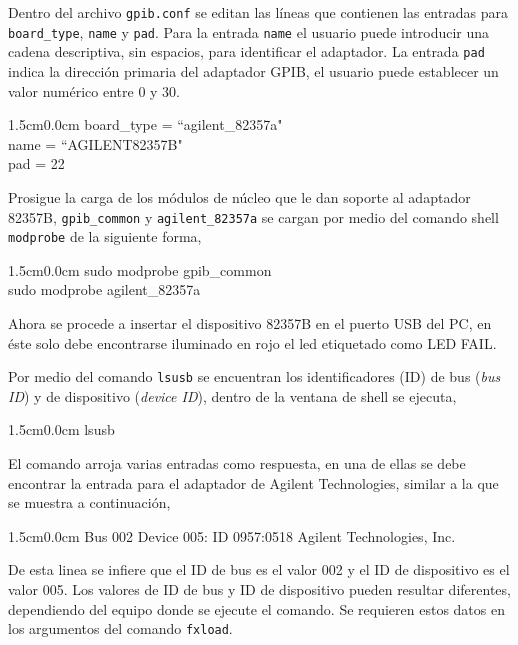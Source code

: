 \documentclass[paper=letter,oneside,fontsize=11pt, parskip=full]{scrartcl}
\newenvironment{code}
	{\begin{adjustwidth}{1.5cm}{0.0cm}\ttfamily}
	{\end{adjustwidth}}
\begin{document}
		Dentro del archivo \texttt{gpib.conf} se editan las líneas que contienen las entradas para \texttt{board\_type}, \texttt{name} y \texttt{pad}. Para la entrada \texttt{name} el usuario puede introducir una cadena descriptiva, sin espacios, para identificar el adaptador. La entrada \texttt{pad} indica la dirección primaria del adaptador GPIB, el usuario puede establecer un valor numérico entre 0 y 30.
		
		\begin{code}	
			board\_type = ``agilent\_82357a" \\		
			name = ``AGILENT82357B" \\		
			pad = 22
		\end{code}
		
		Prosigue la carga de los módulos de núcleo que le dan soporte al adaptador 82357B, \texttt{gpib\_common} y \texttt{agilent\_82357a} se cargan por medio del comando shell \texttt{modprobe} de la siguiente forma,
		
		\begin{code}
			sudo modprobe gpib\_common \\		
			sudo modprobe agilent\_82357a
		\end{code}
		
		Ahora se procede a insertar el dispositivo 82357B en el puerto USB del PC, en éste solo debe encontrarse iluminado en rojo el led etiquetado como LED FAIL. 
		
		Por medio del comando \texttt{lsusb} se encuentran los identificadores (ID) de bus (\emph{bus ID}) y de dispositivo (\emph{device ID}), dentro de la ventana de shell se ejecuta,
		
		\begin{code}
			lsusb
		\end{code}
		
		El comando arroja varias entradas como respuesta, en una de ellas se debe encontrar la entrada para el adaptador de Agilent Technologies, similar a la que se muestra a continuación,
	
		\begin{code}
			Bus 002 Device 005: ID 0957:0518 Agilent Technologies, Inc.
		\end{code}
		
		De esta linea se infiere que el ID de bus es el valor 002 y el ID de dispositivo es el valor 005. Los valores de ID de bus y ID de dispositivo pueden resultar diferentes, dependiendo del equipo donde se ejecute el comando. Se requieren estos datos en los argumentos del comando \texttt{fxload}.
		
\end{document}
